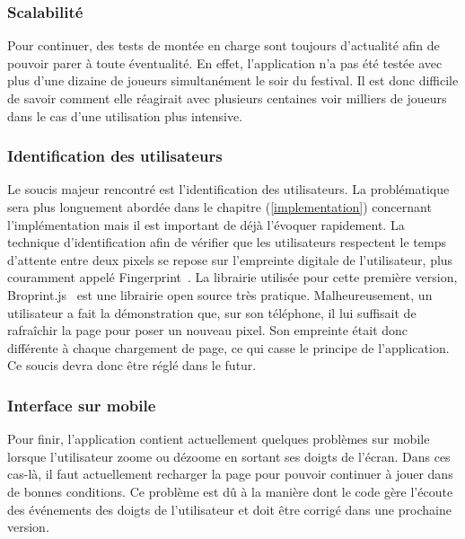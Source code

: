 \subsubsection{Scalabilité}
Pour continuer, des tests de montée en charge sont toujours d'actualité afin de pouvoir parer à toute éventualité. En effet, l'application n'a pas été testée avec plus d'une dizaine de joueurs simultanément le soir du festival. Il est donc difficile de savoir comment elle réagirait avec plusieurs centaines voir milliers de joueurs dans le cas d'une utilisation plus intensive.

\subsubsection{Identification des utilisateurs}
Le soucis majeur rencontré est l'identification des utilisateurs. La problématique sera plus longuement abordée dans le chapitre (\ref{implementation}) concernant l'implémentation mais il est important de déjà l'évoquer rapidement. La technique d'identification afin de vérifier que les utilisateurs respectent le temps d'attente entre deux pixels se repose sur l'empreinte digitale de l'utilisateur, plus couramment appelé Fingerprint~\cite{devicefingerprint}. La librairie utilisée pour cette première version, Broprint.js~\cite{broprintjs} est une librairie open source très pratique. Malheureusement, un utilisateur a fait la démonstration que, sur son téléphone, il lui suffisait de rafraîchir la page pour poser un nouveau pixel. Son empreinte était donc différente à chaque chargement de page, ce qui casse le principe de l'application. Ce soucis devra donc être réglé dans le futur.

\subsubsection{Interface sur mobile}
Pour finir, l'application contient actuellement quelques problèmes sur mobile lorsque l'utilisateur zoome ou dézoome en sortant ses doigts de l'écran. Dans ces cas-là, il faut actuellement recharger la page pour pouvoir continuer à jouer dans de bonnes conditions. Ce problème est dû à la manière dont le code gère l'écoute des événements des doigts de l'utilisateur et doit être corrigé dans une prochaine version.
